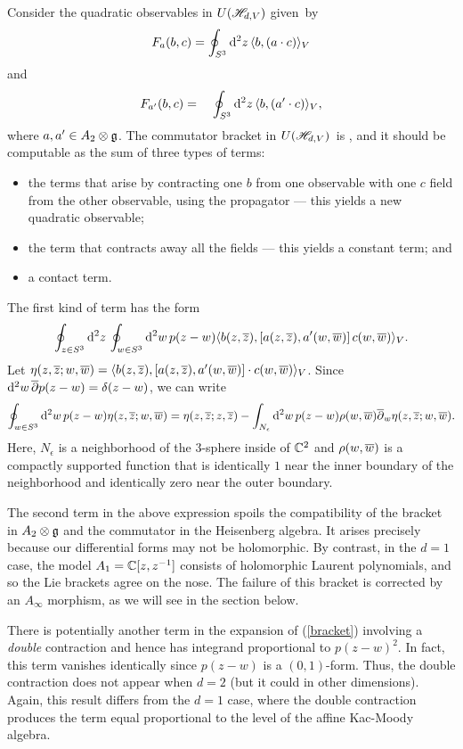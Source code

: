 Consider the quadratic observables in $U (\mathscr H_{d,V})$ given~by
\[
F_a(b,c) = \oint_{S^3} {\rm d}^2 z\, \langle b, (a \cdot c)\rangle_V 
\]
and
\[
F_{a'}(b,c) = \quad \oint_{S^3} {\rm d}^2 z\, \langle b, (a'\cdot c)\rangle_V,
\]
where $a,a' \in A_2 \otimes \mathfrak g$. 
The commutator bracket in $U (\mathscr H_{d,V})$~is
\beqn\label{bracket}
,
\eeqn
and it should be computable as the sum of three types of terms: 
\begin{itemize}
\item the terms that arise by contracting one $b$ from one observable with one $c$ field from the other observable, using the propagator --- this yields a new quadratic observable;
\item the term that contracts away all the fields --- this yields a constant term; and
\item a contact term.
\end{itemize}
The first kind of term has the form
\[
\oint_{z \in S^3} {\rm d}^2 z\, \oint_{w \in S^3} {\rm d}^2 w\, p(z-w) \langle b(z,\overline{z}), [a(z,\overline{z}), a'(w,\overline{w})] \, c(w,\overline{w})\rangle_V  .
\]
Let $\eta(z,\overline{z};w,\overline{w}) = \langle b(z,\overline{z}), [a(z,\overline{z}), a'(w,\overline{w})] \cdot c(w,\overline{w})\rangle_V$.
Since ${\rm d}^2 w\, \overline{\partial} p(z-w) = \delta(z-w)$, we can write 
\[
\oint_{w \in S^3} {\rm d}^2 w\, p(z-w) \eta(z,\overline{z};w,\overline{w}) = \eta(z,\overline{z};z,\overline{z})- \int_{N_{\epsilon}} {\rm d}^2 w\, p(z-w) \rho(w,\overline{w}) \overline{\partial}_w \eta(z,\overline{z};w,\overline{w}) .
\] 
Here, $N_\epsilon$ is a neighborhood of the $3$-sphere inside of $\mathbb C^2$ and $\rho(w,\overline{w})$ is a compactly supported function that is identically $1$ near the inner boundary of the neighborhood and identically zero near the outer boundary.

The second term in the above expression  spoils the compatibility of the bracket in $A_2 \otimes \mathfrak g$ and the commutator in the Heisenberg algebra.
It arises precisely because our differential forms may not be holomorphic.
By contrast, in the $d=1$ case, the model $A_1 = \mathbb C[z,z^{-1}]$ consists of holomorphic Laurent polynomials, and so the Lie brackets agree on the nose. 
The failure of this bracket is corrected by an $A_\infty$ morphism, as we will see in the section below.

There is potentially another term in the expansion of (\ref{bracket}) involving a {\em double} contraction and hence has integrand proportional to $p(z-w)^2$. 
In fact, this term vanishes identically since $p(z-w)$ is a $(0,1)$-form. 
Thus, the double contraction does not appear when $d=2$ (but it could in other dimensions). 
Again, this result differs from the $d=1$ case, where the double contraction produces the term equal proportional to the level of the affine Kac-Moody algebra. 

